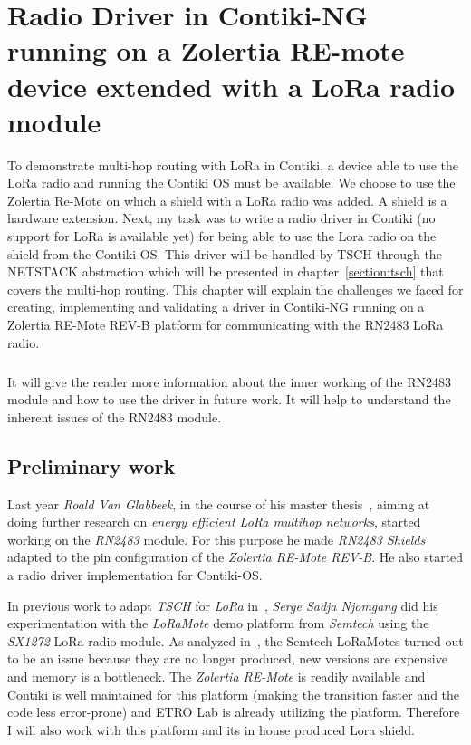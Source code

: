 \chapter{Radio Driver in Contiki-NG running on a Zolertia RE-mote device extended with a LoRa radio module\label{section:radio}}

To demonstrate multi-hop routing with LoRa in Contiki, a device able to use
the LoRa radio and running the Contiki OS must be available.
We choose to use the Zolertia Re-Mote on which a shield with a LoRa radio was
added. A shield is a hardware extension.
Next, my task was to write a radio driver in Contiki (no support for LoRa is available yet)
for being able to use the Lora radio on the shield from the Contiki OS.
This driver will be handled by TSCH through the NETSTACK abstraction
which will be presented in chapter~\ref{section:tsch} that covers the multi-hop routing.
This chapter will explain the challenges we faced for creating, implementing
and validating a driver in Contiki-NG running on a Zolertia RE-Mote REV-B
platform for communicating with the RN2483 LoRa radio.

\paragraph{}

It will give the reader more information about the inner working of
the RN2483 module and how to use the driver in future work.
It will help to understand the inherent issues of the RN2483 module.

\section{Preliminary work}

Last year \emph{Roald Van Glabbeek}, in the course of his master thesis~\cite{8847137},
aiming at doing further research on \emph{energy efficient LoRa multihop networks},
started working on the \emph{RN2483} module.
For this purpose he made \emph{RN2483 Shields} adapted to the pin
configuration of the \emph{Zolertia RE-Mote REV-B}. He also started a radio driver
implementation for Contiki-OS\@.

In previous work to adapt \emph{TSCH} for \emph{LoRa}
in~\cite{njomgang_2018}, \emph{Serge Sadja Njomgang} did his experimentation with
the \emph{LoRaMote} demo platform from \emph{Semtech} using the \emph{SX1272} LoRa
radio module.
As analyzed in~\cite{8847137}, the Semtech LoRaMotes turned out to be an issue
because they are no longer produced, new versions are expensive and memory is
a bottleneck.
The \emph{Zolertia RE-Mote} is readily available and
Contiki is well maintained for this platform (making the transition faster and
the code less error-prone) and ETRO Lab is already utilizing the platform.
Therefore I will also work with this platform and its in house produced Lora shield.

